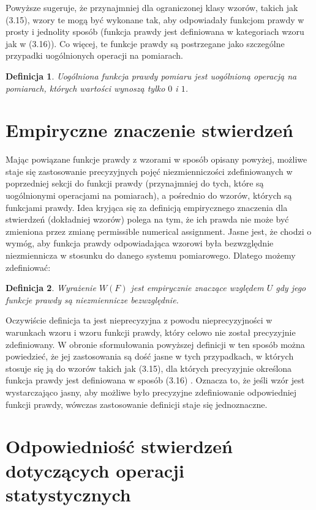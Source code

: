 \documentclass[12pt,a4paper]{report}
\newtheorem{definition}{Definicja}[chapter]
\begin{document}
Powyższe sugeruje, że przynajmniej dla ograniczonej klasy wzorów, takich jak (3.15), wzory te mogą być wykonane tak, aby odpowiadały funkcjom prawdy w prosty i jednolity sposób (funkcja prawdy jest definiowana w kategoriach wzoru jak w (3.16)). Co więcej, te funkcje prawdy są postrzegane jako szczególne przypadki uogólnionych operacji na pomiarach.
\begin{definition}
Uogólniona funkcja prawdy pomiaru jest uogólnioną operacją na pomiarach, których wartości wynoszą tylko $0$ i $1$.
\end{definition}
\section{Empiryczne znaczenie stwierdzeń}

Mając powiązane funkcje prawdy z wzorami w sposób opisany powyżej, możliwe staje się zastosowanie precyzyjnych pojęć niezmienniczości zdefiniowanych w poprzedniej sekcji do funkcji prawdy (przynajmniej do tych, które są uogólnionymi operacjami na pomiarach), a pośrednio do wzorów, których są funkcjami prawdy. Idea kryjąca się za definicją empirycznego znaczenia dla stwierdzeń (dokładniej wzorów) polega na tym, że ich prawda nie może być zmieniona przez zmianę permissible numerical assignment. Jasne jest, że chodzi o wymóg, aby funkcja prawdy odpowiadająca wzorowi była bezwzględnie niezmiennicza w stosunku do danego systemu pomiarowego. Dlatego możemy zdefiniować:
\begin{definition}
Wyrażenie $W(F)$ jest empirycznie znaczące względem $U$ gdy jego funkcje prawdy są niezmiennicze bezwzględnie.
\end{definition}
Oczywiście definicja ta jest nieprecyzyjna z powodu nieprecyzyjności w warunkach wzoru i wzoru funkcji prawdy, który celowo nie został precyzyjnie zdefiniowany. W obronie sformułowania powyższej definicji w ten sposób można powiedzieć, że jej zastosowania są dość jasne w tych przypadkach, w których stosuje się ją do wzorów takich jak (3.15), dla których precyzyjnie określona funkcja prawdy jest definiowana w sposób (3.16) . Oznacza to, że jeśli wzór jest wystarczająco jasny, aby możliwe było precyzyjne zdefiniowanie odpowiedniej funkcji prawdy, wówczas zastosowanie definicji staje się jednoznaczne.
\section{Odpowiedniość stwierdzeń dotyczących operacji statystycznych}
\end{document}
